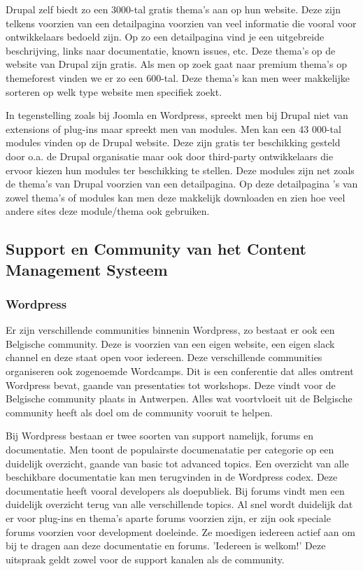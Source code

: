Drupal zelf biedt zo een 3000-tal gratis thema's aan op hun website. Deze zijn telkens voorzien van een detailpagina voorzien van veel informatie die vooral voor ontwikkelaars bedoeld zijn. Op zo een detailpagina vind je een uitgebreide beschrijving, links naar documentatie, known issues, etc. Deze thema's op de website van Drupal zijn gratis. Als men op zoek gaat naar premium thema's op themeforest vinden we er zo een 600-tal. Deze thema's kan men weer makkelijke sorteren op welk type website men specifiek zoekt. 

In tegenstelling zoals bij Joomla en Wordpress, spreekt men bij Drupal niet van extensions of plug-ins maar spreekt men van modules. Men kan een 43 000-tal modules vinden op de Drupal website. Deze zijn gratis ter beschikking gesteld door o.a. de Drupal organisatie maar ook door third-party ontwikkelaars die ervoor kiezen hun modules ter beschikking te stellen. Deze modules zijn net zoals de thema's van Drupal voorzien van een detailpagina. Op deze detailpagina 's van zowel thema's of modules kan men deze makkelijk downloaden en zien hoe veel andere sites deze module/thema ook gebruiken.

\subsection{Support en Community van het Content Management Systeem}
\subsubsection{Wordpress}
Er zijn verschillende communities binnenin Wordpress, zo bestaat er ook een Belgische community. Deze is voorzien van een eigen website, een eigen slack channel en deze staat open voor iedereen. Deze verschillende communities organiseren ook zogenoemde Wordcamps. Dit is een conferentie dat alles omtrent Wordpress bevat, gaande van presentaties tot workshops. Deze vindt voor de Belgische community plaats in Antwerpen. Alles wat voortvloeit uit de Belgische community heeft als doel om de community vooruit te helpen.

Bij Wordpress bestaan er twee soorten van support namelijk, forums en documentatie. Men toont de populairste documenatatie per categorie op een duidelijk overzicht, gaande van basic tot advanced topics. Een overzicht van alle beschikbare documentatie kan men terugvinden in de Wordpress codex. Deze documentatie heeft vooral developers als doepubliek. Bij forums vindt men een duidelijk overzicht terug van alle verschillende topics. Al snel wordt duidelijk dat er voor plug-ins en thema's aparte forums voorzien zijn, er zijn ook speciale forums voorzien voor development doeleinde. Ze moedigen iedereen actief aan om bij te dragen aan deze documentatie en forums. 'Iedereen is welkom!' Deze uitspraak geldt zowel voor de support kanalen als de community.
